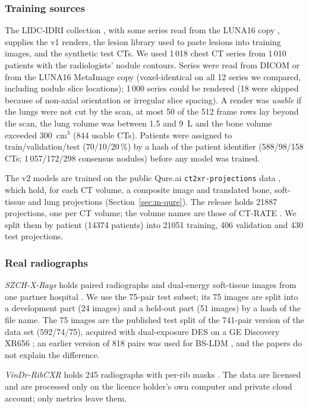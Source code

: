 \subsubsection{Training sources}
The LIDC-IDRI collection \cite{armato2011lidc,armato2015lidctcia,clark2013tcia}, with some series read from the LUNA16 copy
\cite{setio2017luna16}, supplies the v1 renders, the lesion library used to paste lesions into training images, and the synthetic test CTs.
We used 1\,018 chest CT series from 1\,010 patients with the radiologists' nodule contours. Series were read from DICOM or from the LUNA16
MetaImage copy (voxel-identical on all 12 series we compared, including nodule slice locations); 1\,000 series could be rendered (18 were
skipped because of non-axial orientation or irregular slice spacing). A render was \emph{usable} if the lungs were not cut by the scan, at
most 50 of the 512 frame rows lay beyond the scan, the lung volume was between 1.5 and 9~L and the bone volume exceeded 300~cm$^3$ (844
usable CTs). Patients were assigned to train/validation/test (70/10/20\,\%) by a hash of the patient identifier (588/98/158 CTs;
1\,057/172/298 consensus nodules) before any model was trained.

The v2 models are trained on the public Qure.ai \texttt{ct2xr-projections} data \cite{angaitkar2026anatomy}, which hold, for each CT
volume, a composite image and translated bone, soft-tissue and lung projections (Section~\ref{sec:m-qure}). The release holds \num{21887}
projections, one per CT volume; the volume names are those of CT-RATE \cite{hamamci2026ctrate}. We split them by patient (\num{14374}
patients) into \num{21051} training, 406 validation and 430 test projections.

\subsubsection{Real radiographs}
\emph{SZCH-X-Rays} holds paired radiographs and dual-energy soft-tissue images from one partner hospital \cite{sun2026bsldm,sun2026debonedit}.
We use the 75-pair test subset; its 75 images are split into a development part (24 images) and a held-out part (51 images) by a hash of
the file name. The 75 images are the published test split of the 741-pair version of the data set (592/74/75), acquired with dual-exposure
DES on a GE Discovery XR656 \cite{sun2026debonedit}; an earlier version of 818 pairs was used for BS-LDM \cite{sun2026bsldm}, and the
papers do not explain the difference.

\emph{VinDr-RibCXR} holds 245 radiographs with per-rib masks \cite{nguyen2021ribcxr}. The data are licensed and are processed only on the
licence holder's own computer and private cloud account; only metrics leave them.

